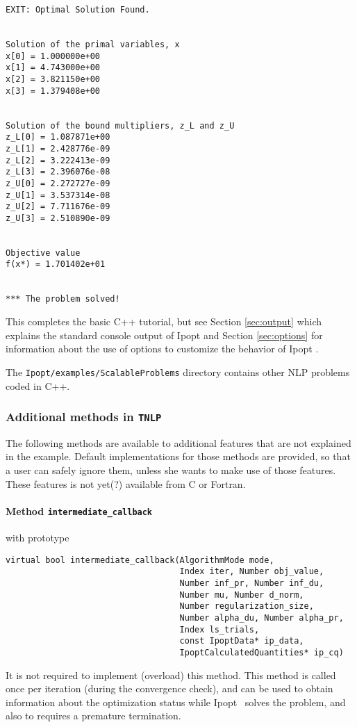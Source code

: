 \documentclass[10pt]{article}
\newcommand{\Ipopt}{{\sc Ipopt }}
\begin{document}
\begin{footnotesize}
\begin{verbatim}
EXIT: Optimal Solution Found.


Solution of the primal variables, x
x[0] = 1.000000e+00
x[1] = 4.743000e+00
x[2] = 3.821150e+00
x[3] = 1.379408e+00


Solution of the bound multipliers, z_L and z_U
z_L[0] = 1.087871e+00
z_L[1] = 2.428776e-09
z_L[2] = 3.222413e-09
z_L[3] = 2.396076e-08
z_U[0] = 2.272727e-09
z_U[1] = 3.537314e-08
z_U[2] = 7.711676e-09
z_U[3] = 2.510890e-09


Objective value
f(x*) = 1.701402e+01


*** The problem solved!
\end{verbatim}
\end{footnotesize}

This completes the basic C++ tutorial, but see Section
\ref{sec:output} which explains the standard console output of \Ipopt
and Section \ref{sec:options} for information about the use of options
to customize the behavior of \Ipopt.

The {\tt Ipopt/examples/ScalableProblems} directory contains other NLP
problems coded in C++.

\subsubsection{Additional methods in {\tt TNLP}}\label{sec:add_meth}

The following methods are available to additional features that are
not explained in the example.  Default implementations for those
methods are provided, so that a user can safely ignore them, unless
she wants to make use of those features.  These features is not yet(?)
available from C or Fortran.

\paragraph{Method \texttt{intermediate\_callback}} with prototype
\begin{verbatim}
virtual bool intermediate_callback(AlgorithmMode mode,
                                   Index iter, Number obj_value,
                                   Number inf_pr, Number inf_du,
                                   Number mu, Number d_norm,
                                   Number regularization_size,
                                   Number alpha_du, Number alpha_pr,
                                   Index ls_trials,
                                   const IpoptData* ip_data,
                                   IpoptCalculatedQuantities* ip_cq)
\end{verbatim}
It is not required to implement (overload) this method.  This method
is called once per iteration (during the convergence check), and can
be used to obtain information about the optimization status while
\Ipopt\ solves the problem, and also to requires a premature
termination.
\end{document}
